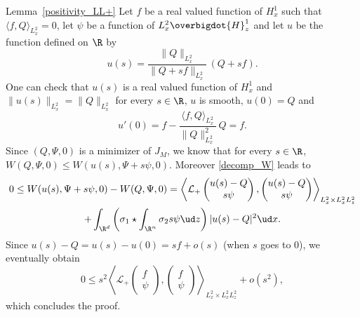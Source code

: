 \begin{ProofOf}{Lemma~\ref{positivity_LL+}}
Let $f$ be a real valued function of $H_{x}^{1}$ such that $\langle f,Q\rangle_{L_{x}^{2}}=0$, let $\psi$ be a function of $L_{x}^{2}\overbigdot{H}_{z}^{1}$ and let $u$ be the function defined on $\R$ by
\[
u(s)=\frac{\|Q\|_{L_{x}^{2}}}{\|Q+sf\|_{L_{x}^{2}}}\,(Q+sf).
\]
One can check that $u(s)$ is a real valued function of $H_{x}^{1}$ and $\|u(s)\|_{L_{x}^{2}}=\|Q\|_{L_{x}^{2}}$ for every $s\in\R$, $u$ is smooth, $u(0)=Q$ and
\[
u'(0)=f-\frac{\langle f,Q\rangle_{L_{x}^{2}}}{\|Q\|_{L_{x}^{2}}^{2}}\,Q=f.
\]
Since $(Q,\Psi,0)$ is a minimizer of $J_{M}$, we know that for every $s\in\R$, $W(Q,\Psi,0)\leq W(u(s),\Psi+s\psi,0)$. Moreover \eqref{decomp_W} leads to
\bgroup
{}
\begin{multline*}
0\leq W(u(s),\Psi+s\psi,0)-W(Q,\Psi,0)=\left\langle\mathcal{L}_{+}\begin{pmatrix} u(s)-Q\\s\psi \end{pmatrix},\begin{pmatrix} u(s)-Q\\s\psi \end{pmatrix}\right\rangle_{L_{x}^{2}\times L_{x}^{2}L_{z}^{2}}\\
+\int_{\R^{d}}\left(\sigma_{1}\star\int_{\R^{n}}\sigma_{2}s\psi\ud z\right)|u(s)-Q|^{2}\ud x.
\end{multline*}
\egroup
Since $u(s)-Q=u(s)-u(0)=sf+o(s)$ (when $s$ goes to $0$), we eventually obtain
\[
0\leq s^{2}\left\langle\mathcal{L}_{+}\begin{pmatrix} f\\\psi \end{pmatrix},\begin{pmatrix} f\\\psi \end{pmatrix}\right\rangle_{L_{x}^{2}\times L_{x}^{2}L_{z}^{2}}+o(s^{2}),
\]
which concludes the proof.
\end{ProofOf}

